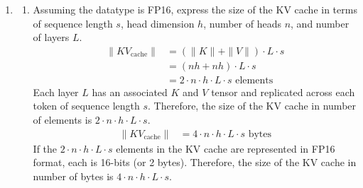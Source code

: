 \documentclass[12pt]{article}
\begin{document}
\begin{enumerate}[label=\textbf{Q\arabic*.}]
\begin{enumerate}
    \end{enumerate}
        
    \item 
    \begin{enumerate}
        \item Assuming the datatype is FP16, express the size of the KV cache in terms of sequence length $s$, head dimension $h$, number of heads $n$, and number of layers $L$.
        \begin{align*}
            \|KV_{\text{cache}}\| &= \left( \|K\|+\|V\| \right) \cdot L \cdot s \\
            &= \left( nh + nh \right) \cdot L \cdot s \\
            &= 2 \cdot n \cdot h \cdot L \cdot s \text{ elements}
        \end{align*}
        Each layer $L$ has an associated $K$ and $V$ tensor and replicated across each token of sequence length $s$. Therefore, the size of the KV cache in number of elements is $2 \cdot n \cdot h \cdot L \cdot s$. 
        \begin{align*}
            \|KV_{\text{cache}}\| &= \boxed{4 \cdot n \cdot h \cdot L \cdot s} \text{ bytes}
        \end{align*}
        If the $2 \cdot n \cdot h \cdot L \cdot s$ elements in the KV cache are represented in FP16 format, each is 16-bits (or 2 bytes). Therefore, the size of the KV cache in number of bytes is $4 \cdot n \cdot h \cdot L \cdot s$.\\


\end{enumerate}
\end{enumerate}
\end{document}
